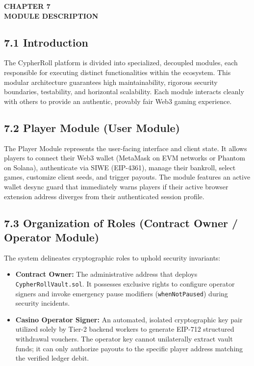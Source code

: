 \vspace*{0.5cm}
\begin{center}
\textbf{CHAPTER 7}\\[0.15cm]
\textbf{MODULE DESCRIPTION}
\end{center}
\label{chap:modules}
\vspace{0.2cm}

\subsection*{7.1 Introduction}
The CypherRoll platform is divided into specialized, decoupled modules, each responsible for executing distinct functionalities within the ecosystem. This modular architecture guarantees high maintainability, rigorous security boundaries, testability, and horizontal scalability. Each module interacts cleanly with others to provide an authentic, provably fair Web3 gaming experience.

\subsection*{7.2 Player Module (User Module)}
The Player Module represents the user-facing interface and client state. It allows players to connect their Web3 wallet (MetaMask on EVM networks or Phantom on Solana), authenticate via SIWE (EIP-4361), manage their bankroll, select games, customize client seeds, and trigger payouts. The module features an active wallet desync guard that immediately warns players if their active browser extension address diverges from their authenticated session profile.

\subsection*{7.3 Organization of Roles (Contract Owner / Operator Module)}
The system delineates cryptographic roles to uphold security invariants:
\begin{itemize}[leftmargin=1.5em]
    \item \textbf{Contract Owner:} The administrative address that deploys \texttt{CypherRollVault.sol}. It possesses exclusive rights to configure operator signers and invoke emergency pause modifiers (\texttt{whenNotPaused}) during security incidents.
    \item \textbf{Casino Operator Signer:} An automated, isolated cryptographic key pair utilized solely by Tier-2 backend workers to generate EIP-712 structured withdrawal vouchers. The operator key cannot unilaterally extract vault funds; it can only authorize payouts to the specific player address matching the verified ledger debit.
\end{itemize}

